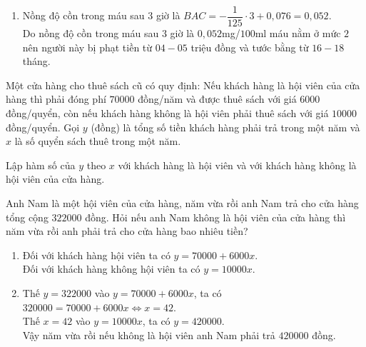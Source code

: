 \begin{bt}
{\begin{enumerate}
			Từ đồ thị ta có hàm số đi qua các điểm $(0;0{,}076)$ và $(1;0{,}068)$ nên ta được
			$\heva{& BAC=0{,}076 \\ & a=-\dfrac{1}{125}.}$\\
			Công thức biểu thị mối quan hệ giữa nồng độ cồn trong máu $(BAC)$ sau $t$ giờ sử dụng là $BAC=-\dfrac{1}{125}t+0{,}076$.
			\item Nồng độ cồn trong máu sau $3$ giờ là $BAC=-\dfrac{1}{125}\cdot 3+0{,}076=0{,}052$.\\
			Do nồng độ cồn trong máu sau $3$ giờ là $0{,}052$mg/$100$ml máu nằm ở mức $2$ nên người này bị phạt tiền từ $04-05$ triệu đồng  và tước bằng từ $16-18$ tháng.
		\end{enumerate}
	}
\end{bt}

\begin{bt}%
	Một cửa hàng cho thuê sách cũ có quy định: Nếu khách hàng là hội viên của cửa hàng thì phải đóng phí $70000$ đồng/năm và được thuê sách với giá $6000$ đồng/quyển, còn nếu khách hàng không là hội viên phải thuê sách với giá $10000$ đồng/quyển. Gọi $y$ (đồng) là tổng số tiền khách hàng phải trả trong một năm và $x$ là số quyển sách thuê trong một năm.
	\begin{listEX}
		\item Lập hàm số của $y$ theo $x$ với khách hàng là hội viên và với khách hàng không là hội viên của cửa hàng.
		\item Anh Nam là một hội viên của cửa hàng, năm vừa rồi anh Nam trả cho cửa hàng tổng cộng
		$322000$ đồng. Hỏi nếu anh Nam không là hội viên của cửa hàng thì năm vừa rồi anh phải trả
		cho cửa hàng bao nhiêu tiền?
	\end{listEX}
	\loigiai
	{
		\begin{enumerate}
			\item Đối với khách hàng hội viên ta có $y=70000+6000x$.\\
			Đối với khách hàng không hội viên ta có $y=10000x$.
			\item Thế $y=322000$ vào $y=70000+6000x$, ta có $320000=70000+6000x \Leftrightarrow x=42$.\\
			Thế $x=42$ vào $y=10000x$, ta có $y=420000$.\\
			Vậy năm vừa rồi nếu không là hội viên anh Nam phải trả $420000$ đồng.
		\end{enumerate}
	}
\end{bt}

